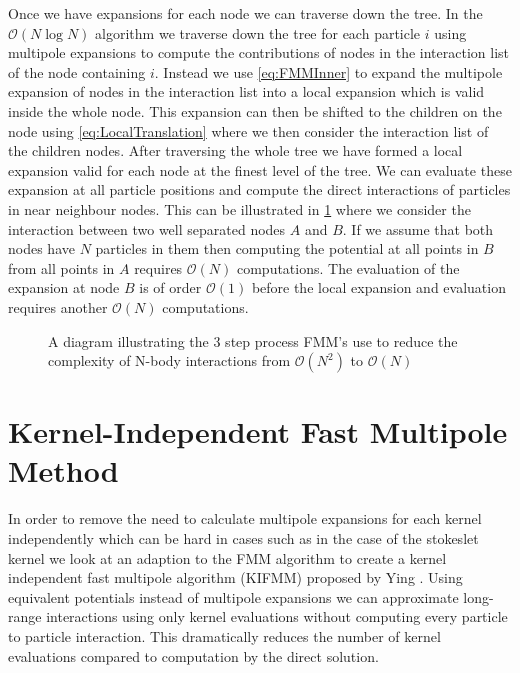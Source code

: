 Once we have expansions for each node we can traverse down the tree.
In the $\mathcal{O}(N\log N)$ algorithm we traverse down the tree for each particle $i$ using multipole expansions to compute the contributions of nodes in the interaction list of the node containing $i$. Instead we use \cref{eq:FMMInner} to expand the multipole expansion of nodes in the interaction list into a local expansion which is valid inside the whole node. This expansion can then be shifted to the children on the node using  \ref{eq:LocalTranslation} where we then consider the interaction list of the children nodes.  After traversing the whole tree we have formed a local expansion valid for each node at the finest level of the tree. We can evaluate these expansion at all particle positions and compute the direct interactions of particles in near neighbour nodes. This can be illustrated in \cref{fig:3Step} where we consider the interaction between two well separated nodes $A$ and $B$. If we assume that both nodes have $N$ particles in them then computing the potential at all points in $B$ from all points in $A$ requires $\mathcal{O}(N)$ computations. The evaluation of the expansion at node $B$ is of order $\mathcal{O}(1)$ before the local expansion and evaluation requires another $\mathcal{O}(N)$ computations.

\begin{figure}
    \centering
        \resizebox{.6\linewidth}{!}{}
    \caption{A diagram illustrating the 3 step process FMM's use to reduce the complexity of N-body interactions from $\mathcal{O}(N^2)$ to $\mathcal{O}(N)$}
    \label{fig:3Step}
\end{figure}







\section{Kernel-Independent Fast Multipole Method}\label{sec:KIFMM}
In order to remove the need to calculate multipole expansions for each kernel independently which can be hard in cases such as in the case of the stokeslet kernel we look at an adaption to the FMM algorithm to create a kernel independent fast multipole algorithm (KIFMM) proposed by Ying \cite{Ying2004, Ying2005,}. Using equivalent potentials instead of multipole expansions we can approximate long-range interactions using only kernel evaluations without computing every particle to particle interaction. This dramatically reduces the number of kernel evaluations compared to computation by the direct solution.

